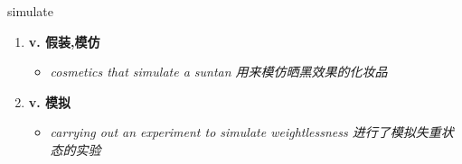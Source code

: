 
\begin{frame}
{\huge simulate}
\begin{center}
\begin{enumerate}\Large
  \item \textbf{v. 假装,模仿}
  \begin{itemize}
    \item \em{\Large{cosmetics that simulate a suntan 用来模仿晒黑效果的化妆品}}
  \end{itemize}
  \item \textbf{v. 模拟}
  \begin{itemize}
    \item \em{\Large{carrying out an experiment to simulate weightlessness 进行了模拟失重状态的实验}}
  \end{itemize}
\end{enumerate}
\end{center}
\end{frame}
